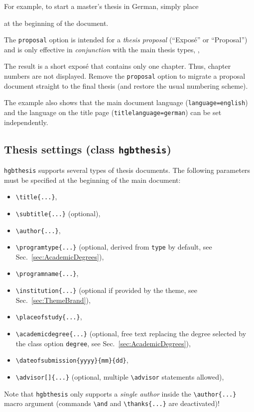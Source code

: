 \documentclass[language=english]{hgbarticle}
\begin{document}
\noindent
For example, to start a master's thesis in German, simply place
%
%
at the beginning of the document.

The \texttt{proposal} option is intended for a \emph{thesis proposal} (``Exposé'' or ``Proposal'') and is
only effective in \emph{conjunction} with the main thesis types, \eg,
%
%
The result is a short exposé that contains only one chapter. Thus,
chapter numbers are not displayed. Remove the \texttt{proposal} option to
migrate a proposal document straight to the final thesis (and restore the usual
numbering scheme).

The example also shows that the main document language (\texttt{language=english}) and the
language on the title page (\texttt{titlelanguage=german}) can be set independently.

\subsection{Thesis settings (class \texttt{hgbthesis})}

\texttt{hgbthesis} supports several types of thesis documents. The following
parameters must be specified at the beginning of the main document:
%
\begin{itemize}
    \item \verb!\title{...}!,
    \item \verb!\subtitle{...}! (optional),
    \item \verb!\author{...}!,
    \item \verb!! (optional, derived from \texttt{type} by default, see Sec.~\ref{sec:AcademicDegrees}), 
    \item \verb!!,
    \item \verb!! (optional if provided by the theme, see Sec.~\ref{sec:ThemeBrand}),
    \item \verb!!,
    \item \verb!! (optional, free text replacing the degree selected by the class option \texttt{degree}, see Sec.~\ref{sec:AcademicDegrees}),
    \item \verb!!,
    \item \verb!! (optional, multiple \verb!\advisor! statements allowed),
\end{itemize}
%
Note that \texttt{hgbthesis} only supports a \emph{single author} inside the
\verb!\author{...}! macro argument (commands \verb!\and! and
\verb!\thanks{...}! are deactivated)!
\end{document}
